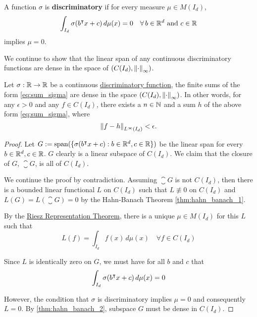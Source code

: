 \begin{definition}
    \label{def:dis_func}
    A function $\sigma$ is \textbf{discriminatory} if for every measure $\mu \in
    M(I_d)$,
    \begin{equation}
        \int_{I_d} \sigma(b{}^{\intercal} x + c) \,d\mu(x) = 0 \quad 
        \forall \,b \in \mathbb{R}^d \textnormal{ and } c \in \mathbb{R}
    \end{equation}
    implies $\mu = 0$.
\end{definition}

We continue to show that the linear span of any continuous discriminatory
functions are dense in the space of $(C(I_d), \left\| \cdot \right\|_{\infty})$.

\begin{theorem}
    Let $\sigma: \mathbb{R} \to \mathbb{R}$ be a continuous
    \hyperref[def:dis_func]{discriminatory function}, the finite sums of the
    form \eqref{eq:sum_sigma} are dense in the space $(C(I_d),
    \left\| \cdot \right\|_{\infty})$. In other words, for any $\epsilon > 0$ and any $f
    \in C(I_d)$, there exists a $n \in \mathbb{N}$ and a sum $h$ of the above form
    \eqref{eq:sum_sigma}, where
    \begin{equation}
        \left\| f - h \right\|_{L^{\infty}(I_d)} < \epsilon.
    \end{equation}
\end{theorem}

\begin{proof}
    Let $G := \operatorname*{span}(\{\sigma(b{}^{\intercal} x + c): b \in \mathbb{R}^d, c \in \mathbb{R} \})$ be the linear
    span for every $b\in\mathbb{R}^d, c\in\mathbb{R}$. $G$ clearly is a linear subspace of
    $C(I_d)$. We claim that the closure of $G$, $\closure{G}$, is all of
    $C(I_d)$.

    We continue the proof by contradiction. Assuming $\closure{G}$ is not
    $C(I_d)$, then there is a bounded linear functional $L$ on $C(I_d)$ such
    that $L \not\equiv 0$ on $C(I_d)$ and $L(G) = L(\closure{G}) = 0$ by the
    Hahn-Banach Theorem \ref{thm:hahn_banach_1}.

    By the \hyperref[thm:riesz_rep]{Riesz Representation Theorem}, there is a
    unique $\mu \in M(I_d)$ for this $L$ such that
    \begin{equation}
        L(f) = \int_{I_d} f(x) \,d\mu(x) \quad \forall f \in C(I_d)
    \end{equation}

    Since $L$ is identically zero on $G$, we must have for all $b$ and $c$ that
    \begin{equation}
        \int_{I_d} \sigma(b{}^{\intercal} x + c) \,d\mu(x) = 0
    \end{equation}

    However, the condition that $\sigma$ is discriminatory implies $\mu = 0$ and
    consequently $L = 0$. By \eqref{thm:hahn_banach_2}, subspace $G$ must be
    dense in $C(I_d)$.
\end{proof}

